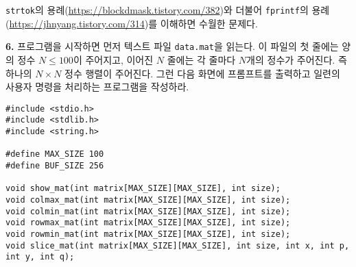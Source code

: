 \documentclass[a4paper,chapter,atbegshi]{oblivoir}
\begin{document}
\texttt{strtok}의 용례(\url{https://blockdmask.tistory.com/382})와 더불어
\texttt{fprintf}의 용례(\url{https://jhnyang.tistory.com/314})를 이해하면
수월한 문제다.
\hfill\break
\begin{mdframed}\textbf{6. }
  프로그램을 시작하면 먼저 텍스트 파일 \texttt{data.mat}을 읽는다. 이 파일의
  첫 줄에는 양의 정수 $N\leq 100$이 주어지고, 이어진 $N$ 줄에는 각 줄마다
  $N$개의 정수가 주어진다. 즉 하나의 $N\times N$ 정수 행렬이 주어진다.
  그런 다음 화면에 프롬프트를 출력하고 일련의 사용자 명령을 처리하는
  프로그램을 작성하라.
\end{mdframed}
\begin{lstlisting}[style=C]
#include <stdio.h>
#include <stdlib.h>
#include <string.h>

#define MAX_SIZE 100
#define BUF_SIZE 256

void show_mat(int matrix[MAX_SIZE][MAX_SIZE], int size);
void colmax_mat(int matrix[MAX_SIZE][MAX_SIZE], int size);
void colmin_mat(int matrix[MAX_SIZE][MAX_SIZE], int size);
void rowmax_mat(int matrix[MAX_SIZE][MAX_SIZE], int size);
void rowmin_mat(int matrix[MAX_SIZE][MAX_SIZE], int size);
void slice_mat(int matrix[MAX_SIZE][MAX_SIZE], int size, int x, int p, int y, int q);


\end{lstlisting}
\end{document}
